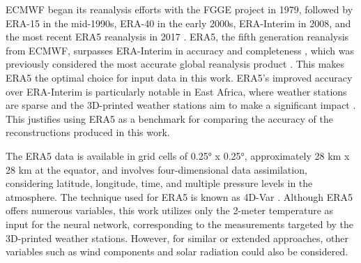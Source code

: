 ECMWF began its reanalysis efforts with the FGGE project in 1979, followed by ERA-15 in the mid-1990s, ERA-40 in the early 2000s, ERA-Interim in 2008, and the most recent ERA5 reanalysis in 2017 \cite{Hersbach2020ERA5quality}. ERA5, the fifth generation reanalysis from ECMWF, surpasses ERA-Interim in accuracy and completeness \cite{Hersbach2020ERA5quality}, which was previously considered the most accurate global reanalysis product \cite{Beck2019interimWasBest}. This makes ERA5 the optimal choice for input data in this work. ERA5's improved accuracy over ERA-Interim is particularly notable in East Africa, where weather stations are sparse and the 3D-printed weather stations aim to make a significant impact \cite{Gleixner2020ERA5africa}. This justifies using ERA5 as a benchmark for comparing the accuracy of the reconstructions produced in this work.

The ERA5 data is available in grid cells of 0.25° x 0.25°, approximately 28 km x 28 km at the equator, and involves four-dimensional data assimilation, considering latitude, longitude, time, and multiple pressure levels in the atmosphere. The technique used for ERA5 is known as 4D-Var \cite{era5}. Although ERA5 offers numerous variables, this work utilizes only the 2-meter temperature as input for the neural network, corresponding to the measurements targeted by the 3D-printed weather stations. However, for similar or extended approaches, other variables such as wind components and solar radiation could also be considered.